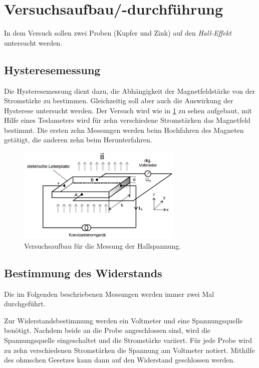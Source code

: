 \section{Versuchsaufbau/-durchführung}
In dem Versuch sollen zwei Proben (Kupfer und Zink) auf den \emph{Hall-Effekt} untersucht werden. %

\subsection{Hysteresemessung}
Die Hysteresemessung dient dazu, die Abhängigkeit der Magnetfeldstärke
von der Stromstärke zu bestimmen.
Gleichzeitig soll aber auch die Auswirkung der Hysterese untersucht werden.
 Der Versuch wird wie in \ref{fig: auf_hall} zu sehen aufgebaut, %
mit Hilfe eines Teslameters wird für zehn verschiedene Stromstärken das Magnetfeld bestimmt. %
Die ersten zehn Messungen werden beim Hochfahren des Magneten getätigt, %
die anderen zehn beim Herunterfahren.

\begin{figure}
  \centering
  \includegraphics[width=0.7\textwidth]{pics/Halleffekt_aufbau.png}
  \caption{Versuchsaufbau für die Messung der Hallspannung. \cite{anleitung311}}
  \label{fig: auf_hall}
\end{figure}


\subsection{Bestimmung des Widerstands}

Die im Folgenden beschriebenen Messungen werden immer zwei Mal durchgeführt. %

Zur Widerstandsbestimmung werden ein Voltmeter und
eine Spannungsquelle benötigt.
Nachdem beide an die Probe angeschlossen sind,
wird die Spannungsquelle eingeschaltet und die Stromstärke variiert.
Für jede Probe wird zu zehn verschiedenen Stromstärken
die Spannung am Voltmeter notiert.
Mithilfe des ohmschen Gesetzes kann dann auf den Widerstand geschlossen werden.

